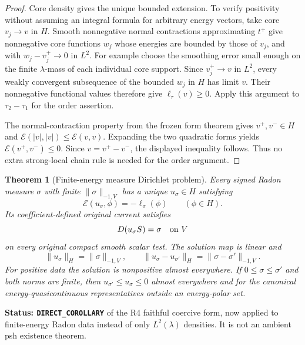 \documentclass[11pt,a4paper]{article}
\numberwithin{equation}{section}
\newtheorem{theorem}{Theorem}[section]
\theoremstyle{definition}
\theoremstyle{remark}
\begin{document}
\begin{proof}
Core density gives the unique bounded extension. To verify positivity
without assuming an integral formula for arbitrary energy vectors,
take core $v_j\to v$ in $H$. Smooth nonnegative normal contractions
approximating $t^+$ give nonnegative core functions $w_j$ whose energies
are bounded by those of $v_j$, and with $w_j-v_j^+\to0$ in $L^2$.
For example choose the smoothing error small enough on the finite
$\lambda$-mass of each individual core support. Since $v_j^+\to v$
in $L^2$, every weakly convergent subsequence of the bounded $w_j$ in
$H$ has limit $v$. Their nonnegative functional values therefore give
$\ell_\tau(v)\ge0$. Apply this argument to $\tau_2-\tau_1$ for
the order assertion.

The normal-contraction property from the frozen form theorem gives
$v^+,v^-\in H$ and
$\mathcal E(|v|,|v|)\le\mathcal E(v,v)$. Expanding the two quadratic
forms yields $\mathcal E(v^+,v^-)\le0$. Since $v=v^+-v^-$, the
displayed inequality follows. Thus no extra strong-local chain rule is
needed for the order argument.
\end{proof}

\begin{theorem}[Finite-energy measure Dirichlet problem]
\label{thm:r6-measure-energy-dirichlet}
Every signed Radon measure $\sigma$ with finite $\|\sigma\|_{-1,V}$
has a unique $u_\sigma\in H$ satisfying
\[
                 \mathcal E(u_\sigma,\phi)=-\ell_\sigma(\phi)
                                      \qquad(\phi\in H).
\]
Its coefficient-defined original current satisfies
\[
                       D(u_\sigma S)=\sigma\quad\hbox{on }V
\]
on every original compact smooth scalar test. The solution map is
linear and
\[
 \|u_\sigma\|_H=\|\sigma\|_{-1,V},\qquad
 \|u_\sigma-u_{\sigma'}\|_H=\|\sigma-\sigma'\|_{-1,V}.
\]
For positive data the solution is nonpositive almost everywhere.
If $0\le\sigma\le\sigma'$ and both norms are finite, then
$u_{\sigma'}\le u_\sigma\le0$ almost everywhere and for the canonical
energy-quasicontinuous representatives outside an energy-polar set.
\end{theorem}

\noindent\textbf{Status: \texttt{DIRECT\_COROLLARY}} of the R4 faithful
coercive form, now applied to finite-energy Radon data instead of only
$L^2(\lambda)$ densities. It is not an ambient psh existence theorem.
\end{document}
